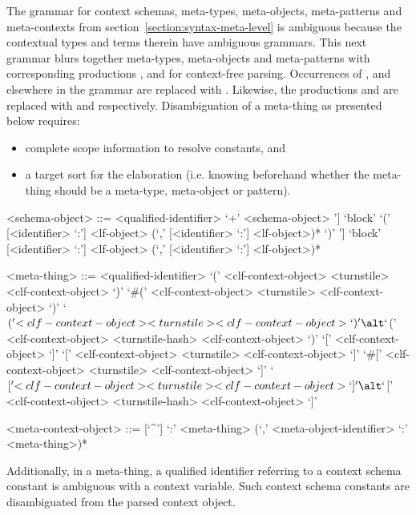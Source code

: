 The grammar for context schemas, meta-types, meta-objects, meta-patterns and meta-contexts from section~\ref{section:syntax-meta-level} is ambiguous because the contextual \LF types and terms therein have ambiguous grammars.
This next grammar blurs together meta-types, meta-objects and meta-patterns with corresponding productions ,  and  for context-free parsing.
Occurrences of ,  and  elsewhere in the grammar are replaced with .
Likewise, the productions  and  are replaced with  and  respectively.
Disambiguation of a meta-thing as presented below requires:
\begin{itemize}
\item complete scope information to resolve constants, and
\item a target sort for the elaboration (i.e. knowing beforehand whether the meta-thing should be a meta-type, meta-object or pattern).
\end{itemize}

\begin{grammar}
<schema-object> ::= <qualified-identifier>
 `+' <schema-object>
\alt [`some' `[' <identifier> `:' <lf-object> (`,' <identifier> `:' <lf-object>)* `]'] `block' `(' [<identifier> `:'] <lf-object> (`,' [<identifier> `:'] <lf-object>)* `)'
\alt [`some' `[' <identifier> `:' <lf-object> (`,' <identifier> `:' <lf-object>)* `]'] `block' [<identifier> `:'] <lf-object> (`,' [<identifier> `:'] <lf-object>)*

<meta-thing> ::= <qualified-identifier>
\alt `(' <clf-context-object> <turnstile> <clf-context-object> `)'
\alt `#(' <clf-context-object> <turnstile> <clf-context-object> `)'
\alt `$(' <clf-context-object> <turnstile> <clf-context-object> `)'
\alt `$(' <clf-context-object> <turnstile-hash> <clf-context-object> `)'
\alt `[' <clf-context-object> `]'
\alt `[' <clf-context-object> <turnstile> <clf-context-object> `]'
\alt `#[' <clf-context-object> <turnstile> <clf-context-object> `]'
\alt `$[' <clf-context-object> <turnstile> <clf-context-object> `]'
\alt `$[' <clf-context-object> <turnstile-hash> <clf-context-object> `]'

<meta-context-object> ::= [`^']
 `:' <meta-thing> (`,' <meta-object-identifier> `:' <meta-thing>)*
\end{grammar}

Additionally, in a meta-thing, a qualified identifier referring to a context schema constant is ambiguous with a context variable.
Such context schema constants are disambiguated from the parsed context object.

